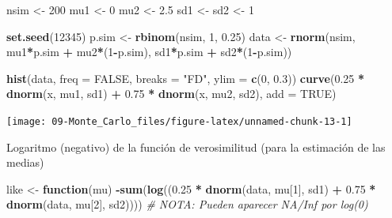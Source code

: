 \documentclass[
]{book}
\newenvironment{Shaded}{\begin{snugshade}}{\end{snugshade}}
\newcommand{\CommentTok}[1]{\textcolor[rgb]{0.56,0.35,0.01}{\textit{#1}}}
\newcommand{\ControlFlowTok}[1]{\textcolor[rgb]{0.13,0.29,0.53}{\textbf{#1}}}
\newcommand{\DataTypeTok}[1]{\textcolor[rgb]{0.13,0.29,0.53}{#1}}
\newcommand{\DecValTok}[1]{\textcolor[rgb]{0.00,0.00,0.81}{#1}}
\newcommand{\FloatTok}[1]{\textcolor[rgb]{0.00,0.00,0.81}{#1}}
\newcommand{\KeywordTok}[1]{\textcolor[rgb]{0.13,0.29,0.53}{\textbf{#1}}}
\newcommand{\NormalTok}[1]{#1}
\newcommand{\OperatorTok}[1]{\textcolor[rgb]{0.81,0.36,0.00}{\textbf{#1}}}
\newcommand{\OtherTok}[1]{\textcolor[rgb]{0.56,0.35,0.01}{#1}}
\newcommand{\StringTok}[1]{\textcolor[rgb]{0.31,0.60,0.02}{#1}}
\theoremstyle{break}
\theoremstyle{definition}
\theoremstyle{definition}
\theoremstyle{definition}
\theoremstyle{remark}
\begin{document}
\begin{Shaded}
\begin{Highlighting}[]
\NormalTok{nsim <-}\StringTok{ }\DecValTok{200}
\NormalTok{mu1 <-}\StringTok{ }\DecValTok{0} 
\NormalTok{mu2 <-}\StringTok{ }\FloatTok{2.5}
\NormalTok{sd1 <-}\StringTok{ }\NormalTok{sd2 <-}\StringTok{ }\DecValTok{1}

\KeywordTok{set.seed}\NormalTok{(}\DecValTok{12345}\NormalTok{)}
\NormalTok{p.sim <-}\StringTok{ }\KeywordTok{rbinom}\NormalTok{(nsim, }\DecValTok{1}\NormalTok{, }\FloatTok{0.25}\NormalTok{)}
\NormalTok{data <-}\StringTok{ }\KeywordTok{rnorm}\NormalTok{(nsim, mu1}\OperatorTok{*}\NormalTok{p.sim }\OperatorTok{+}\StringTok{ }\NormalTok{mu2}\OperatorTok{*}\NormalTok{(}\DecValTok{1}\OperatorTok{-}\NormalTok{p.sim), sd1}\OperatorTok{*}\NormalTok{p.sim }\OperatorTok{+}\StringTok{ }\NormalTok{sd2}\OperatorTok{*}\NormalTok{(}\DecValTok{1}\OperatorTok{-}\NormalTok{p.sim))}

\KeywordTok{hist}\NormalTok{(data, }\DataTypeTok{freq =} \OtherTok{FALSE}\NormalTok{, }\DataTypeTok{breaks =} \StringTok{"FD"}\NormalTok{, }\DataTypeTok{ylim =} \KeywordTok{c}\NormalTok{(}\DecValTok{0}\NormalTok{, }\FloatTok{0.3}\NormalTok{))}
\KeywordTok{curve}\NormalTok{(}\FloatTok{0.25} \OperatorTok{*}\StringTok{ }\KeywordTok{dnorm}\NormalTok{(x, mu1, sd1) }\OperatorTok{+}\StringTok{ }\FloatTok{0.75} \OperatorTok{*}\StringTok{ }\KeywordTok{dnorm}\NormalTok{(x, mu2, sd2), }\DataTypeTok{add =} \OtherTok{TRUE}\NormalTok{)}
\end{Highlighting}
\end{Shaded}

\begin{center}\texttt{[image: 09-Monte\_Carlo\_files/figure-latex/unnamed-chunk-13-1]} \end{center}

Logaritmo (negativo) de la función de verosimilitud
(para la estimación de las medias)

\begin{Shaded}
\begin{Highlighting}[]
\NormalTok{like <-}\StringTok{ }\ControlFlowTok{function}\NormalTok{(mu)}
  \OperatorTok{-}\KeywordTok{sum}\NormalTok{(}\KeywordTok{log}\NormalTok{((}\FloatTok{0.25} \OperatorTok{*}\StringTok{ }\KeywordTok{dnorm}\NormalTok{(data, mu[}\DecValTok{1}\NormalTok{], sd1) }\OperatorTok{+}\StringTok{ }\FloatTok{0.75} \OperatorTok{*}\StringTok{ }\KeywordTok{dnorm}\NormalTok{(data, mu[}\DecValTok{2}\NormalTok{], sd2))))}
  \CommentTok{# NOTA: Pueden aparecer NA/Inf por log(0)}
\end{Highlighting}
\end{Shaded}
\end{document}

